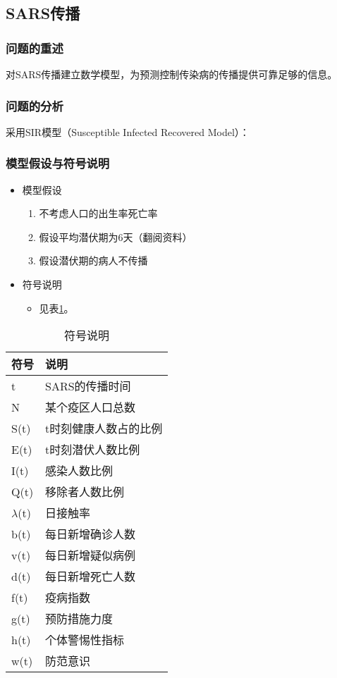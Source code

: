 \subsection{SARS传播}
\subsubsection{问题的重述}
对SARS传播建立数学模型，为预测控制传染病的传播提供可靠足够的信息。
\subsubsection{问题的分析}
采用SIR模型（Susceptible Infected Recovered Model）：\\
\phantom{may the force be with you}

\subsubsection{模型假设与符号说明}
\begin{itemize}
\item 模型假设
    \begin{enumerate}
    \item 不考虑人口的出生率死亡率
    \item 假设平均潜伏期为6天（翻阅资料）
    \item 假设潜伏期的病人不传播
    \end{enumerate}
\item 符号说明
    \begin{itemize}
    \item 见表\ref{tab:symintro}。
    \end{itemize}
\end{itemize}

\begin{table}[htbp]
\centering
\begin{tabular}{@{}ll@{}}
\toprule
符号 & 说明 \\ \midrule
t & SARS的传播时间 \\
N & 某个疫区人口总数 \\
S(t) & t时刻健康人数占的比例 \\
E(t) & t时刻潜伏人数比例 \\
I(t) & 感染人数比例 \\
Q(t) & 移除者人数比例 \\
$\lambda$(t) & 日接触率 \\
b(t) & 每日新增确诊人数 \\
v(t) & 每日新增疑似病例 \\
d(t) & 每日新增死亡人数 \\
f(t) & 疫病指数 \\
g(t) & 预防措施力度 \\
h(t) & 个体警惕性指标 \\
w(t) & 防范意识 \\ \bottomrule
\end{tabular}
\caption{符号说明}\label{tab:symintro}
\end{table}


